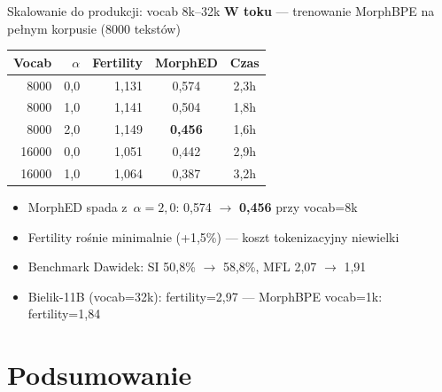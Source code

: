 \documentclass[aspectratio=169,11pt]{beamer}
\begin{document}
\begin{frame}{Skalowanie do produkcji: vocab 8k--32k}
\textbf{W toku} --- trenowanie MorphBPE na pełnym korpusie (8000 tekstów)

\bigskip

\begin{center}
\small
\begin{tabular}{rrrcc}
\toprule
Vocab & $\alpha$ & Fertility & MorphED & Czas \\
\midrule
8000 & 0{,}0 & 1{,}131 & 0{,}574 & 2{,}3h \\
8000 & 1{,}0 & 1{,}141 & 0{,}504 & 1{,}8h \\
\rowcolor{slayergreen!20}
8000 & 2{,}0 & 1{,}149 & \textbf{0{,}456} & 1{,}6h \\
16000 & 0{,}0 & 1{,}051 & 0{,}442 & 2{,}9h \\
16000 & 1{,}0 & 1{,}064 & 0{,}387 & 3{,}2h \\
\bottomrule
\end{tabular}
\end{center}

\bigskip

\begin{itemize}
  \item MorphED spada z~$\alpha=2{,}0$: 0{,}574 $\to$ \textbf{0{,}456} przy vocab=8k
  \item Fertility rośnie minimalnie (+1{,}5\%) --- koszt tokenizacyjny niewielki
  \item Benchmark Dawidek: SI 50{,}8\% $\to$ 58{,}8\%, MFL 2{,}07 $\to$ 1{,}91
  \item Bielik-11B (vocab=32k): fertility=2{,}97 --- MorphBPE vocab=1k: fertility=1{,}84
\end{itemize}
\end{frame}

\section{Podsumowanie}
\end{document}
